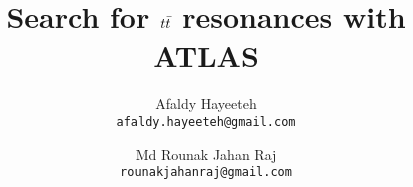 \title{Search for \(t \Bar{t}\) resonances with ATLAS}


\author{Afaldy Hayeeteh\\ \texttt{afaldy.hayeeteh@gmail.com} \and Md Rounak Jahan Raj \\ \texttt{rounakjahanraj@gmail.com}}




\maketitle



